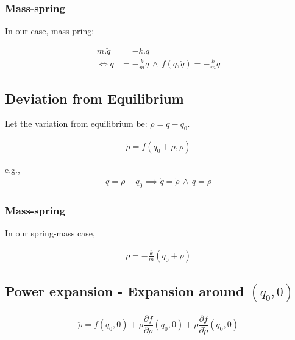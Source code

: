 \documentclass[12pt]{article}
\begin{document}
\subsubsection{Mass-spring}
\label{sec:org6e3345a}
In our case, mass-pring:

\begin{equation}
\begin{aligned}
m.\ddot{q} &= -k.q\\
\Leftrightarrow \ddot{q} &= - \frac{k}{m}q \, \land \, f(q,\dot{q})= - \frac{k}{m}q
\end{aligned}
\end{equation}

\subsection{Deviation from Equilibrium}
\label{sec:orga13ec44}
Let the variation from equilibrium be: \(\rho = q - q_0\).

\begin{equation}
\begin{aligned}
\ddot{\rho} = f(q_0 + \rho{}, \dot{\rho{}})
\end{aligned}
\end{equation}

e.g.,
\begin{equation}
\begin{aligned}
q = \rho + q_0 \implies \dot{q} = \dot{\rho} \,\land\,\ddot{q} = \ddot{\rho}
\end{aligned}
\end{equation}

\subsubsection{Mass-spring}
\label{sec:org30ebd78}
In our spring-mass case,

\begin{equation}
\begin{aligned}
\ddot{\rho} = - \frac{k}{m}(q_0 + \rho)
\end{aligned}
\end{equation}

\subsection{Power expansion - Expansion around \((q_0,0)\)}
\label{sec:orga6cd5da}

\begin{equation}
\begin{aligned}
\ddot{\rho} = f(q_0, 0) + \rho \dfrac{\partial{f}}{\partial{\rho}}(q_0,0) + \dot{\rho} \dfrac{\partial{f}}{\partial{\dot{\rho}}}(q_0,0)
\end{aligned}
\end{equation}
\end{document}
